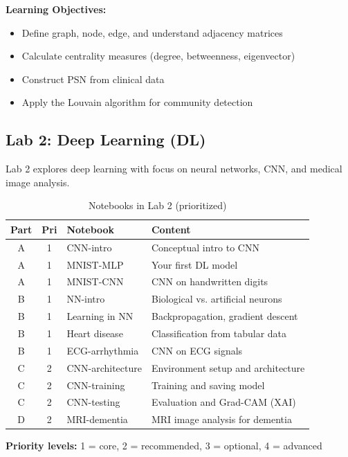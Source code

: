 \documentclass[11pt,a4paper]{article}
\begin{document}
\textbf{Learning Objectives:}
\begin{itemize}[nosep]
    \item Define graph, node, edge, and understand adjacency matrices
    \item Calculate centrality measures (degree, betweenness, eigenvector)
    \item Construct PSN from clinical data
    \item Apply the Louvain algorithm for community detection
\end{itemize}

\subsection{Lab 2: Deep Learning (DL)}

Lab 2 explores deep learning with focus on neural networks, CNN, and medical image analysis.

\begin{table}[htbp]
\centering
\caption{Notebooks in Lab 2 (prioritized)}
\label{tab:lab2}
\begin{tabular}{@{}cclp{5.5cm}@{}}
\toprule
\textbf{Part} & \textbf{Pri} & \textbf{Notebook} & \textbf{Content} \\
\midrule
A & 1 & CNN-intro & Conceptual intro to CNN \\
A & 1 & MNIST-MLP & Your first DL model \\
A & 1 & MNIST-CNN & CNN on handwritten digits \\
\midrule
B & 1 & NN-intro & Biological vs. artificial neurons \\
B & 1 & Learning in NN & Backpropagation, gradient descent \\
B & 1 & Heart disease & Classification from tabular data \\
B & 1 & ECG-arrhythmia & CNN on ECG signals \\
\midrule
C & 2 & CNN-architecture & Environment setup and architecture \\
C & 2 & CNN-training & Training and saving model \\
C & 2 & CNN-testing & Evaluation and Grad-CAM (XAI) \\
\midrule
D & 2 & MRI-dementia & MRI image analysis for dementia \\
\bottomrule
\end{tabular}
\end{table}

\textbf{Priority levels:} 1 = core, 2 = recommended, 3 = optional, 4 = advanced
\end{document}
